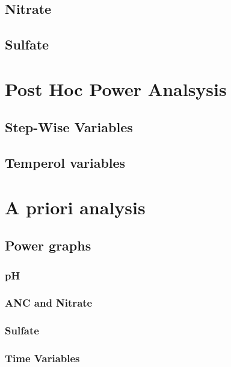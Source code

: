 	\section{Nitrate}
		

	\section{Sulfate}
		


\chapter{Post Hoc Power Analsysis}
	\section{Step-Wise Variables}


	\section{Temperol variables}


\chapter{A priori analysis}
	\section{Power graphs}
		\subsection{pH}
		\subsection{ANC and Nitrate}
			
		\subsection{Sulfate}
			
		\subsection{Time Variables}
			



















